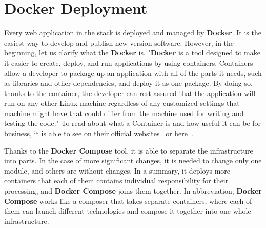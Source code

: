 \section{Docker Deployment}\label{sec:docker-deployment}
Every web application in the stack is deployed and managed by \textbf{Docker}.
It is the easiest way to develop and publish new version software.
However, in the beginning, let us clarify what the \textbf{Docker} is.
"\textbf{Docker} is a tool designed to make it easier to create, deploy, and run applications by using containers.
Containers allow a developer to package up an application with all of the parts it needs, such as libraries and other dependencies, and deploy it as one package.
By doing so, thanks to the container, the developer can rest assured that the application will run on any other Linux machine regardless of any customized settings that machine might have that could differ from the machine used for writing and testing the code."\cite{dockerDescription}
To read about what a Container is and how useful it can be for business, it is able to see on their official websites~\cite{dockerContainer} or here~\cite{dockerDescription}.

Thanks to the \textbf{Docker Compose} tool, it is able to separate the infrastructure into parts.
In the case of more significant changes, it is needed to change only one module, and others are without changes.
In a summary, it deploys more containers that each of them contains individual responsibility for their processing, and \textbf{Docker Compose} joins them together.
In abbreviation, \textbf{Docker Compose} works like a composer that takes separate containers, where each of them can launch different technologies and compose it together into one whole infrastructure.~\cite{dockerCompose}
